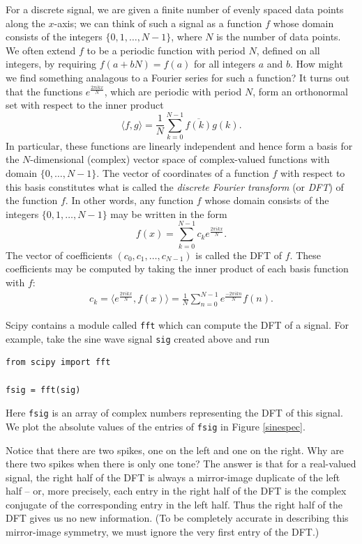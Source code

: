 For a discrete signal, we are given a finite number of evenly spaced data points along the $x$-axis; we can think of such a signal as a function $f$ whose domain consists of the integers $\{0,1,\dots,N-1\}$, where $N$ is the number of data points. 
We often extend $f$ to be a periodic function with period $N$, defined on all integers, by requiring $f(a+bN)=f(a)$ for all integers $a$ and $b$.
How might we find something analagous to a Fourier series for such a function?
It turns out that the functions $e^{\frac{2\pi ikx}N}$, which are periodic with period $N$, form an orthonormal set with respect to the inner product
\[
\langle f,g\rangle = \frac1N\sum_{k=0}^{N-1}\overline{f(k)}g(k).
\]
In particular, these functions are linearly independent and hence form a basis for the $N$-dimensional (complex) vector space of complex-valued functions with domain $\{0,\dots,N-1\}$.
The vector of coordinates of a function $f$ with respect to this basis constitutes what is called the \emph{discrete Fourier transform} (or \emph{DFT}) of the function $f$.
In other words, any function $f$ whose domain consists of the integers $\{0,1,\dots,N-1\}$ may be written in the form
\[
f(x)=\sum_{k=0}^{N-1}c_ke^{\frac{2\pi ikx}N}.
\]
The vector of coefficients $(c_0,c_1,\dots,c_{N-1})$ is called the DFT of $f$. These coefficients may be computed by taking the inner product of each basis function with $f$:
\begin{align}
	c_k=\langle e^{\frac{2\pi ikx}N}, f(x)\rangle=\frac1N\sum_{n=0}^{N-1}e^{\frac{-2\pi ikn}N}f(n) . \label{transform_coefficients}
\end{align}


Scipy contains a module called \texttt{fft} which can compute the DFT of a signal.
For example, take the sine wave signal \texttt{sig} created above and run
\begin{lstlisting}
from scipy import fft

fsig = fft(sig)
\end{lstlisting}
Here \texttt{fsig} is an array of complex numbers representing the DFT of this signal. We plot the absolute values of the entries of \texttt{fsig} in Figure \ref{sinespec}.

Notice that there are two spikes, one on the left and one on the right.
Why are there two spikes when there is only one tone?
The answer is that for a real-valued signal, the right half of the DFT is always a mirror-image duplicate of the left half -- or, more precisely, each entry in the right half of the DFT is the complex conjugate of the corresponding entry in the left half.
Thus the right half of the DFT gives us no new information.
(To be completely accurate in describing this mirror-image symmetry, we must ignore the very first entry of the DFT.)


